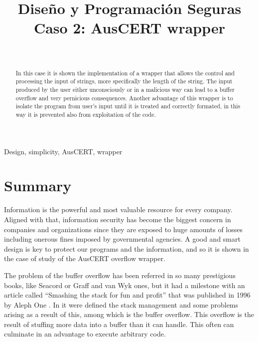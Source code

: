 \documentclass[review]{IEEEtran}
\begin{document}
\title{ Diseño y Programación Seguras \\
Caso 2: AusCERT wrapper 
}

\author{ \\
}

\maketitle

\begin{abstract}
In this case it is shown the implementation of a wrapper that allows the control and processing the input of strings, more specifically the length of the string. The input produced by the user either unconsciously or in a malicious way can lead to a buffer overflow and very pernicious consequences. Another advantage of this wrapper is to isolate the program from user’s input until it is treated and correctly formated, in this way it is prevented also from exploitation of the code. 
\end{abstract}

\begin{IEEEkeywords}
Design, simplicity, AusCERT, wrapper
\end{IEEEkeywords}

\section{Summary}
Information is the powerful and most valuable resource for every company. Aligned with that, information security has become the biggest concern in companies and organizations since they are exposed to huge amounts of losses including onerous fines imposed by governmental agencies. A good and smart design is key to protect our programs and the information, and so it is shown in the case of study of the AusCERT overflow wrapper.

The problem of the buffer overflow has been referred in so many prestigious books, like Seacord\cite{b1} or Graff and van Wyk\cite{b2} ones, but it  had a milestone with an article called “Smashing the stack for fun and profit” that was published in 1996 by Aleph One \cite{b3}. In it were defined the stack management and some problems arising as a result of this, among which is the buffer overflow. This overflow is the result of stuffing more data into a buffer than it can handle. This often can culminate in an advantage to execute arbitrary code.
\end{document}
